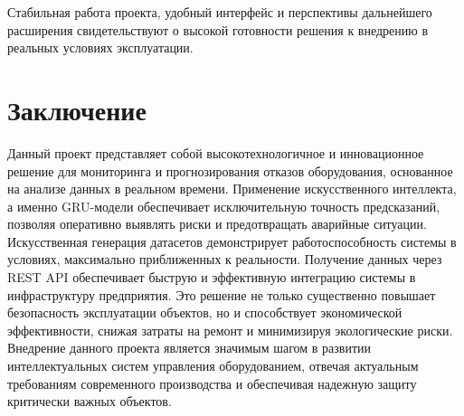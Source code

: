 \documentclass[a4paper,12pt]{article}
\begin{document}
\begin{flushleft}
Стабильная работа проекта, удобный интерфейс и перспективы дальнейшего расширения свидетельствуют о
высокой готовности решения к внедрению в реальных условиях эксплуатации.

\section{Заключение}

Данный проект представляет собой высокотехнологичное и инновационное решение для мониторинга и прогнозирования
отказов оборудования, основанное на анализе данных в реальном времени. Применение искусственного интеллекта,
а именно GRU-модели обеспечивает исключительную точность предсказаний, позволяя оперативно выявлять риски и
предотвращать аварийные ситуации. Искусственная генерация датасетов демонстрирует работоспособность системы в условиях,
максимально приближенных к реальности. Получение данных через REST API обеспечивает быструю и эффективную интеграцию
системы в инфраструктуру предприятия. Это решение не только существенно повышает безопасность эксплуатации объектов,
но и способствует экономической эффективности, снижая затраты на ремонт и минимизируя экологические риски.
Внедрение данного проекта является значимым шагом в развитии интеллектуальных систем управления оборудованием,
отвечая актуальным требованиям современного производства и обеспечивая надежную защиту критически важных объектов.
\end{flushleft}
\end{document}

